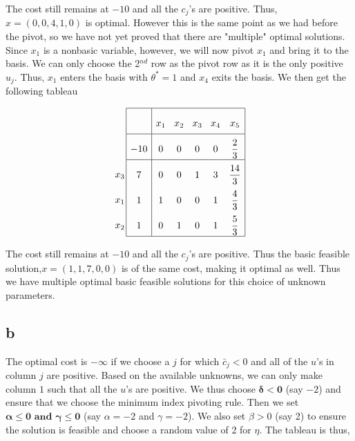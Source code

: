 The cost still remains at $-10$ and all the $c_j$'s are positive. Thus, $x = (0,0,4,1,0)$ is optimal. However this is the same point as we had before the pivot, so we have not yet proved that there are "multiple" optimal solutions. \\

Since $x_1$ is a nonbasic variable, however, we will now pivot $x_1$ and bring it to the basis. We can only choose the 2$^{nd}$ row as the pivot row as it is the only positive $u_j$. Thus, $x_1$ enters the basis with $\theta^* = 1$ and $x_4$ exits the basis. We then get the following tableau

$$
\arraycolsep=1.4pt\def\arraystretch{2.2}
\begin{array}{c}
\\
 \\
x_3 \\
x_1 \\ 
x_2 \\
\end{array}
\arraycolsep=4.4pt\def\arraystretch{2.2}
\begin{array}{|c|ccccc|}
    \hline
    & x_1 & x_2 & x_3 & x_4 & x_5\\ \hline 
 -10 & 0 & 0 & 0 & 0 & \dfrac{2}{3}\\ \hline
  7 & 0 & 0 & 1 & 3 & \dfrac{14}{3}\\
  1 & 1 & 0 & 0 & 1 & \dfrac{4}{3}\\
  1 & 0 & 1 & 0 & 1 & \dfrac{5}{3}\\\hline
\end{array}
$$

The cost still remains at $-10$ and all the $c_j$'s are positive. Thus the basic feasible solution,$x = (1,1,7,0,0)$ is of the same cost, making it optimal as well. Thus we have multiple optimal basic feasible solutions for this choice of unknown parameters.



\subsection*{b}
The optimal cost is $- \infty$ if we choose a $j$ for which $\bar{c}_j < 0$ and all of the $u$'s in column $j$ are positive. Based on the available unknowns, we can only make column $1$ such that all the $u$'s are positive. We thus choose $\boldsymbol{\delta < 0}$ (say $-2$) and ensure that we choose the minimum index pivoting rule. Then we set $\boldsymbol{\alpha \le 0 \text{ and } \gamma \le 0}$ (say $\alpha = -2$ and $\gamma = -2$). We also set $\beta > 0 $ (say 2) to ensure the solution is feasible and choose a random value of 2 for $\eta$. The tableau is thus, 

